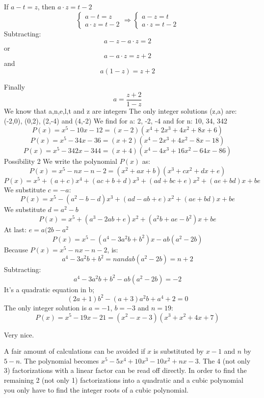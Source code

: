 \begin{solution}
If $a-t=z$, then $a\cdot z=t-2$
\[ \left\{\begin{array}{l}{a-t=z}\\ {a\cdot z=t-2}\end{array}\right. \Rightarrow
 \left\{\begin{array}{l}{a-z=t}\\ {a\cdot z=t-2}\end{array}\right. \]
Subtracting:
\[a-z-a\cdot z=2\]
or\[a-a\cdot z=z+2\]and \[a(1-z)=z+2\]

Finally
\[a=\frac{z+2}{1-z}\]
We know that a,n,e,l,t and z are integers
The only integer solutions (z,a) are: (-2,0), (0,2), (2,-4) and (4,-2)
We find for a: 2,  -2,  -4 and for n: 10, 34, 342
\[P(x)=x^{5}-10x-12=(x-2)(x^{4}+2x^{3}+4x^{2}+8x+6)\]
\[P(x)=x^{5}-34x-36=(x+2)(x^{4}-2x^{3}+4x^{2}-8x-18)\]
\[P(x)=x^{5}-342x-344=(x+4)(x^{4}-4x^{3}+16x^{2}-64x-86)\]
Possibility  2
We write the polynomial $P(x)$ as:
\[P(x)=x^{5}-nx-n-2=(x^{2}+ax+b)(x^{3}+cx^{2}+dx+e)\]
\[P(x)=x^{5}+(a+c)x^{4}+(ac+b+d)x^{3}+(ad+bc+e)x^{2}+(ae+bd)x+be\]
We substitute $c=-a$:
\[P(x)=x^{5}-(a^{2}-b-d)x^{3}+(ad-ab+e)x^{2}+(ae+bd)x+be\]
We substitute $d=a^{2}-b$
\[P(x)=x^{5}+(a^{3}-2ab+e)x^{2}+(a^{2}b+ae-b^{2})x+be\]
At last: $e=a(2b-a^{2}$
\[P(x)=x^{5}-(a^{4}-3a^{2}b+b^{2})x-ab(a^{2}-2b)\]
Because $P(x)=x^{5}-nx-n-2$, is:
\[a^{4}-3a^{2}b+b^{2}=n and ab(a^{2}-2b)=n+2\]
Subtracting:
\[a^{4}-3a^{2}b+b^{2}-ab(a^{2}-2b)=-2\]
It's a quadratic equation in b;
\[(2a+1)b^{2}-(a+3)a^{2}b+a^{4}+2=0\]
The only integer solution is $a=-1$, $b=-3$ and $n=19$:
\[P(x)=x^{5}-19x-21=(x^{2}-x-3)(x^{3}+x^{2}+4x+7)\]
\end{solution}



\begin{solution}
	Very nice.
\end{solution}



\begin{solution}
	A fair amount of calculations can be avoided if $x$ is substituted by $x-1$ and $n$ by $5-n$. The polynomial becomes
$x^5-5x^4+10x^3-10x^2+nx-3$. The 4 (not only 3) factorizations with a linear factor can be read off directly.
In order to find the remaining 2 (not only 1) factorizations into a quadratic and a cubic polynomial you only have to
find the integer roots of a cubic polynomial.
\end{solution}



